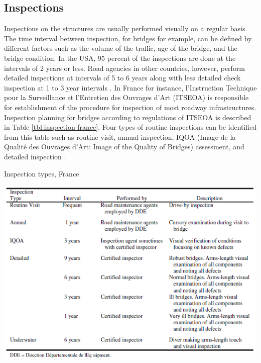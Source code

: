 \subsection{Inspections}
\noindent
Inspections on the structures are usually performed visually on a regular basis. The time interval between inspection, for bridges for example, can be defined by different factors such as the volume of 
the traffic, age of the bridge, and the bridge condition. In the USA, 95 percent of the inspections are done at the intervals of 2 years or less. Road agencies in other countries, however, perform 
detailed inspections at intervals of 5 to 6 years along with less detailed check inspection at 1 to 3 year intervals \citep{NAP14127}. In France for instance, l'Instruction Technique pour la Surveillance 
et l'Entretien 
des Ouvrages d'Art (ITSEOA) is responsible for establishment of the procedure for inspection of most roadway infrastructures. Inspection planning for bridges according to regulations of ITSEOA is 
described in Table \ref{tbl:inspection-france}. Four types of routine inspections can be identified from this table such as routine visit, annual inspection, IQOA (Image de la Qualité des Ouvrages
d'Art: Image of the Quality of Bridges) assessment, and detailed inspection \citep{ITSEOA1979}.  

\begin{table}[hbt!]
  \caption{Inspection types, France}
  \label{tbl:inspection-france}
  \includegraphics[width=0.95\linewidth]{figures/fig-ch1/inspection-france.png}
\end{table}

